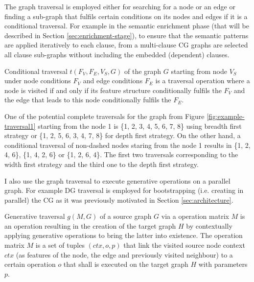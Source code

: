 The graph traversal is employed either for searching for a node or an edge or finding a sub-graph that fulfils certain conditions on its nodes and edges if it is a conditional traversal. For example in the semantic enrichment phase (that will be described in Section \ref{sec:enrichment-stage}), to ensure that the semantic patterns are applied iteratively to each clause, from a multi-clause CG graphs are selected all clause sub-graphs without including the embedded (dependent) clauses. 


\begin{definition}\label{def:conditional-traversal}
    Conditional traversal $t(F_V,F_E,V_S,G)$ of the graph $G$ starting from node $V_S$ under node conditions $F_V$ and edge conditions $F_E$ is a traversal operation where a node is visited if and only if its feature structure conditionally fulfils the $F_V$ and the edge that leads to this node conditionally fulfils the $F_E$.
\end{definition}

One of the potential complete traversals for the graph from Figure \ref{fig:example-traversal1} starting from the node 1 is \{1, 2, 3, 4, 5, 6, 7, 8\} using breadth first strategy or \{1, 2, 5, 6, 3, 4, 7, 8\} for depth first strategy. On the other hand, a conditional traversal of non-dashed nodes staring from the node 1 results in \{1, 2, 4, 6\}, \{1, 4, 2, 6\} or \{1, 2, 6, 4\}. The first two traversals corresponding to the width first strategy and the third one to the depth first strategy. 

I also use the graph traversal to execute generative operations on a parallel graph. For example DG traversal is employed for bootstrapping (i.e. creating in parallel) the CG as it was previously motivated in Section \ref{sec:architecture}.

\begin{definition}\label{def:generative-traversal}
    Generative traversal $g(M,G)$ of a source graph $G$ via a operation matrix $M$ is an operation resulting in the creation of the target graph $H$ by contextually applying generative operations to bring the latter into existence. The operation matrix $M$ is a set of tuples $(ctx,o,p)$ that link the visited source node context $ctx$ (as features of the node, the edge and previously visited neighbour) to a certain operation $o$ that shall is executed on the target graph $H$ with parameters $p$.
\end{definition}

